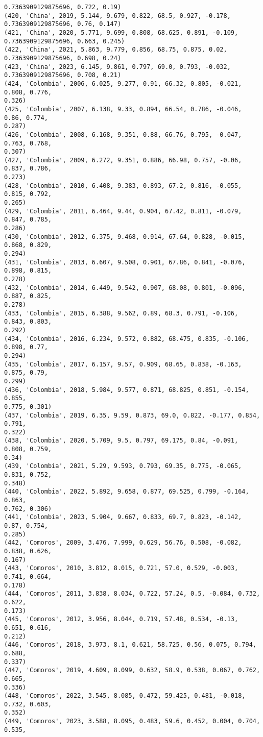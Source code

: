 \documentclass[11pt]{article}
\begin{document}
\begin{Verbatim}[commandchars=\\\{\}]
0.7363909129875696, 0.722, 0.19)
(420, 'China', 2019, 5.144, 9.679, 0.822, 68.5, 0.927, -0.178,
0.7363909129875696, 0.76, 0.147)
(421, 'China', 2020, 5.771, 9.699, 0.808, 68.625, 0.891, -0.109,
0.7363909129875696, 0.663, 0.245)
(422, 'China', 2021, 5.863, 9.779, 0.856, 68.75, 0.875, 0.02,
0.7363909129875696, 0.698, 0.24)
(423, 'China', 2023, 6.145, 9.861, 0.797, 69.0, 0.793, -0.032,
0.7363909129875696, 0.708, 0.21)
(424, 'Colombia', 2006, 6.025, 9.277, 0.91, 66.32, 0.805, -0.021, 0.808, 0.776,
0.326)
(425, 'Colombia', 2007, 6.138, 9.33, 0.894, 66.54, 0.786, -0.046, 0.86, 0.774,
0.287)
(426, 'Colombia', 2008, 6.168, 9.351, 0.88, 66.76, 0.795, -0.047, 0.763, 0.768,
0.307)
(427, 'Colombia', 2009, 6.272, 9.351, 0.886, 66.98, 0.757, -0.06, 0.837, 0.786,
0.273)
(428, 'Colombia', 2010, 6.408, 9.383, 0.893, 67.2, 0.816, -0.055, 0.815, 0.792,
0.265)
(429, 'Colombia', 2011, 6.464, 9.44, 0.904, 67.42, 0.811, -0.079, 0.847, 0.785,
0.286)
(430, 'Colombia', 2012, 6.375, 9.468, 0.914, 67.64, 0.828, -0.015, 0.868, 0.829,
0.294)
(431, 'Colombia', 2013, 6.607, 9.508, 0.901, 67.86, 0.841, -0.076, 0.898, 0.815,
0.278)
(432, 'Colombia', 2014, 6.449, 9.542, 0.907, 68.08, 0.801, -0.096, 0.887, 0.825,
0.278)
(433, 'Colombia', 2015, 6.388, 9.562, 0.89, 68.3, 0.791, -0.106, 0.843, 0.803,
0.292)
(434, 'Colombia', 2016, 6.234, 9.572, 0.882, 68.475, 0.835, -0.106, 0.898, 0.77,
0.294)
(435, 'Colombia', 2017, 6.157, 9.57, 0.909, 68.65, 0.838, -0.163, 0.875, 0.79,
0.299)
(436, 'Colombia', 2018, 5.984, 9.577, 0.871, 68.825, 0.851, -0.154, 0.855,
0.775, 0.301)
(437, 'Colombia', 2019, 6.35, 9.59, 0.873, 69.0, 0.822, -0.177, 0.854, 0.791,
0.322)
(438, 'Colombia', 2020, 5.709, 9.5, 0.797, 69.175, 0.84, -0.091, 0.808, 0.759,
0.34)
(439, 'Colombia', 2021, 5.29, 9.593, 0.793, 69.35, 0.775, -0.065, 0.831, 0.752,
0.348)
(440, 'Colombia', 2022, 5.892, 9.658, 0.877, 69.525, 0.799, -0.164, 0.863,
0.762, 0.306)
(441, 'Colombia', 2023, 5.904, 9.667, 0.833, 69.7, 0.823, -0.142, 0.87, 0.754,
0.285)
(442, 'Comoros', 2009, 3.476, 7.999, 0.629, 56.76, 0.508, -0.082, 0.838, 0.626,
0.167)
(443, 'Comoros', 2010, 3.812, 8.015, 0.721, 57.0, 0.529, -0.003, 0.741, 0.664,
0.178)
(444, 'Comoros', 2011, 3.838, 8.034, 0.722, 57.24, 0.5, -0.084, 0.732, 0.622,
0.173)
(445, 'Comoros', 2012, 3.956, 8.044, 0.719, 57.48, 0.534, -0.13, 0.651, 0.616,
0.212)
(446, 'Comoros', 2018, 3.973, 8.1, 0.621, 58.725, 0.56, 0.075, 0.794, 0.688,
0.337)
(447, 'Comoros', 2019, 4.609, 8.099, 0.632, 58.9, 0.538, 0.067, 0.762, 0.665,
0.336)
(448, 'Comoros', 2022, 3.545, 8.085, 0.472, 59.425, 0.481, -0.018, 0.732, 0.603,
0.352)
(449, 'Comoros', 2023, 3.588, 8.095, 0.483, 59.6, 0.452, 0.004, 0.704, 0.535,

\end{Verbatim}
\end{document}
